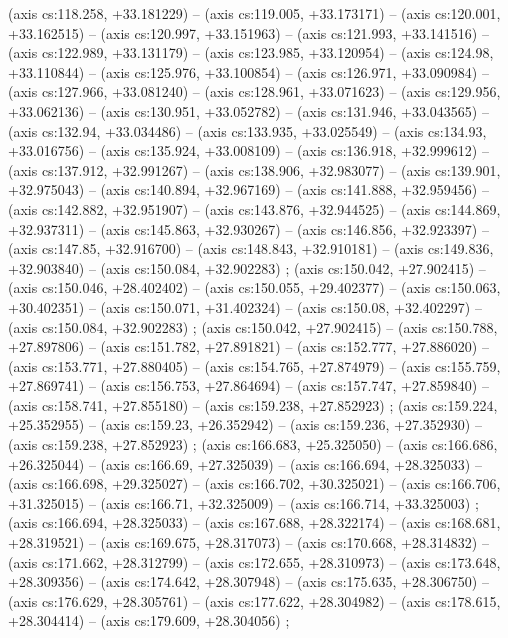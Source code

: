     (axis cs:118.258,    +33.181229) --  (axis cs:119.005,    +33.173171) --  (axis cs:120.001,    +33.162515) --  (axis cs:120.997,    +33.151963) --  (axis cs:121.993,    +33.141516) --  (axis cs:122.989,    +33.131179) --  (axis cs:123.985,    +33.120954) --  (axis cs:124.98,    +33.110844) --  (axis cs:125.976,    +33.100854) --  (axis cs:126.971,    +33.090984) --  (axis cs:127.966,    +33.081240) --  (axis cs:128.961,    +33.071623) --  (axis cs:129.956,    +33.062136) --  (axis cs:130.951,    +33.052782) --  (axis cs:131.946,    +33.043565) --  (axis cs:132.94,    +33.034486) --  (axis cs:133.935,    +33.025549) --  (axis cs:134.93,    +33.016756) --  (axis cs:135.924,    +33.008109) --  (axis cs:136.918,    +32.999612) --  (axis cs:137.912,    +32.991267) --  (axis cs:138.906,    +32.983077) --  (axis cs:139.901,    +32.975043) --  (axis cs:140.894,    +32.967169) --  (axis cs:141.888,    +32.959456) --  (axis cs:142.882,    +32.951907) --  (axis cs:143.876,    +32.944525) --  (axis cs:144.869,    +32.937311) --  (axis cs:145.863,    +32.930267) --  (axis cs:146.856,    +32.923397) --  (axis cs:147.85,    +32.916700) --  (axis cs:148.843,    +32.910181) --  (axis cs:149.836,    +32.903840) --  (axis cs:150.084,    +32.902283) ;
    (axis cs:150.042,    +27.902415) --  (axis cs:150.046,    +28.402402) --  (axis cs:150.055,    +29.402377) --  (axis cs:150.063,    +30.402351) --  (axis cs:150.071,    +31.402324) --  (axis cs:150.08,    +32.402297) --  (axis cs:150.084,    +32.902283) ;
    (axis cs:150.042,    +27.902415) --  (axis cs:150.788,    +27.897806) --  (axis cs:151.782,    +27.891821) --  (axis cs:152.777,    +27.886020) --  (axis cs:153.771,    +27.880405) --  (axis cs:154.765,    +27.874979) --  (axis cs:155.759,    +27.869741) --  (axis cs:156.753,    +27.864694) --  (axis cs:157.747,    +27.859840) --  (axis cs:158.741,    +27.855180) --  (axis cs:159.238,    +27.852923) ;
    (axis cs:159.224,    +25.352955) --  (axis cs:159.23,    +26.352942) --  (axis cs:159.236,    +27.352930) --  (axis cs:159.238,    +27.852923) ;
    (axis cs:166.683,    +25.325050) --  (axis cs:166.686,    +26.325044) --  (axis cs:166.69,    +27.325039) --  (axis cs:166.694,    +28.325033) --  (axis cs:166.698,    +29.325027) --  (axis cs:166.702,    +30.325021) --  (axis cs:166.706,    +31.325015) --  (axis cs:166.71,    +32.325009) --  (axis cs:166.714,    +33.325003) ;
    (axis cs:166.694,    +28.325033) --  (axis cs:167.688,    +28.322174) --  (axis cs:168.681,    +28.319521) --  (axis cs:169.675,    +28.317073) --  (axis cs:170.668,    +28.314832) --  (axis cs:171.662,    +28.312799) --  (axis cs:172.655,    +28.310973) --  (axis cs:173.648,    +28.309356) --  (axis cs:174.642,    +28.307948) --  (axis cs:175.635,    +28.306750) --  (axis cs:176.629,    +28.305761) --  (axis cs:177.622,    +28.304982) --  (axis cs:178.615,    +28.304414) --  (axis cs:179.609,    +28.304056) ;
